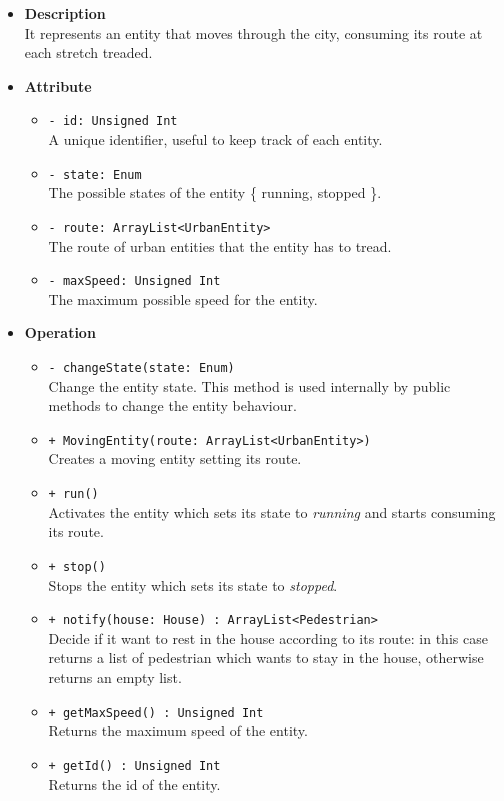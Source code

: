 \begin{itemize}
  \item \textbf{Description} \\
    It represents an entity that moves through the city, consuming its 
route at each stretch treaded.
  \item \textbf{Attribute}
  \begin{itemize}
    \item \texttt{- id: Unsigned Int} \\
A unique identifier, useful to keep track of each entity.
    \item \texttt{- state: Enum} \\
The possible states of the entity \{ running, stopped \}.
    \item \texttt{- route: ArrayList<UrbanEntity>} \\
The route of urban entities that the entity has to tread.
    \item \texttt{- maxSpeed: Unsigned Int} \\
The maximum possible speed for the entity.
  \end{itemize}
  \item \textbf{Operation}
  \begin{itemize}
    \item \texttt{- changeState(state: Enum)} \\
Change the entity state. This method is used internally by public methods to 
change the entity behaviour.
    \item  \texttt{+ MovingEntity(route: ArrayList<UrbanEntity>)} \\
Creates a moving entity setting its route.
    \item  \texttt{+ run()} \\
Activates the entity which sets its state to \textit{running} and 
starts consuming its route.
    \item  \texttt{+ stop()} \\
Stops the entity which sets its state to \textit{stopped}.
    \item  \texttt{+ notify(house: House) : ArrayList<Pedestrian>} \\
Decide if it want to rest in the house according to its route: in this case
returns a list of pedestrian which wants to stay in the house, otherwise returns
an empty list.
    \item  \texttt{+ getMaxSpeed() : Unsigned Int} \\
Returns the maximum speed of the entity.
     \item  \texttt{+ getId() : Unsigned Int} \\
Returns the id of the entity. 
  \end{itemize}
\end{itemize}
